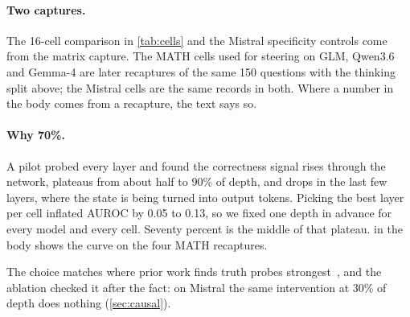\paragraph{Two captures.} The 16-cell comparison in \cref{tab:cells} and the Mistral specificity controls come from the matrix capture. The MATH cells used for steering on GLM, Qwen3.6 and Gemma-4 are later recaptures of the same 150 questions with the thinking split above; the Mistral cells are the same records in both. Where a number in the body comes from a recapture, the text says so.

\paragraph{Why 70\%.} A pilot probed every layer and found the correctness signal rises through the network, plateaus from about half to 90\% of depth, and drops in the last few layers, where the state is being turned into output tokens. Picking the best layer per cell inflated AUROC by 0.05 to 0.13, so we fixed one depth in advance for every model and every cell. Seventy percent is the middle of that plateau.  in the body shows the curve on the four MATH recaptures.

 The choice matches where prior work finds truth probes strongest~\citep{azaria2023internal, marks2024geometry, li2023iti}, and the ablation checked it after the fact: on Mistral the same intervention at 30\% of depth does nothing (\cref{sec:causal}).

